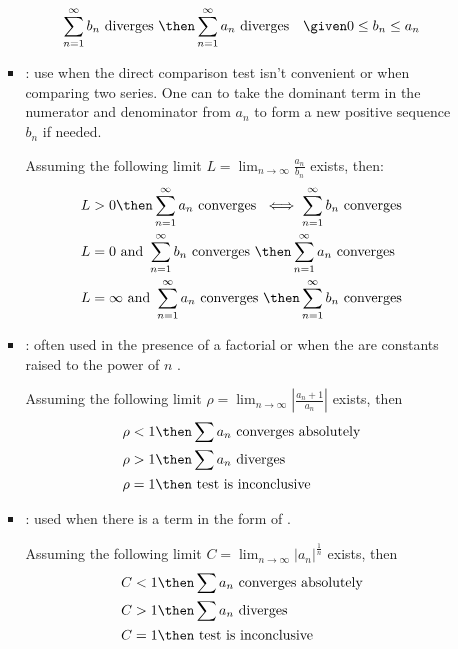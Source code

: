 \begin{itemize}
\begin{itemize}
\begin{itemize}
          \[%
          \sum_{n=1}^{\infty} b_n ~\text{diverges}~ \then
          \sum_{n=1}^{\infty} a_n ~\text{diverges} \quad \given 0 \leq
          b_n \leq a_n
          \]%

        \item {}: use when the direct comparison test
          isn't convenient or when comparing two series. One can to take the
          dominant term in the numerator and denominator from \(a_n\) to form
          a new positive sequence \(b_n\) if needed.

          Assuming the following limit \(L = \lim_{n \to \infty}
          \frac{a_n}{b_n}\) exists, then:
          \begin{align*}
            L &> 0 \then \sum_{n=1}^{\infty} a_n  ~\text{converges}~ \iff
            \sum_{n=1}^{\infty} b_n ~\text{converges}\\
            L &= 0 ~\text{and}~ \sum_{n=1}^{\infty} b_n ~\text{converges}~ \then
            \sum_{n=1}^{\infty} a_n ~\text{converges}\\
            L &= \infty ~\text{and}~ \sum_{n=1}^{\infty} a_n ~\text{converges}~
            \then \sum_{n=1}^{\infty} b_n ~\text{converges}
          \end{align*}

          \newpage %

        \item {}: often used in the presence of a factorial
           or when the are constants raised to the power of
          \(n\) .

          Assuming the following limit \(\rho = \lim_{n \to \infty} \left|
          \frac{a_n + 1}{a_n} \right| \) exists, then
          \begin{align*}
            \rho &< 1 \then \sum a_n ~\text{converges absolutely} \\
            \rho &> 1 \then \sum a_n ~\text{diverges} \\
            \rho &= 1 \then ~\text{test is inconclusive}~
          \end{align*}

        \item {}: used when there is a term in the form of
          .

          Assuming the following limit \(C = \lim_{n \to \infty}
          |a_n|^{\frac{1}{n}} \) exists, then
          \begin{align*}
            C &< 1 \then \sum a_n ~\text{converges absolutely} \\
            C &> 1 \then \sum a_n ~\text{diverges} \\
            C &= 1 \then ~\text{test is inconclusive}~
          \end{align*}


\end{itemize}
\end{itemize}
\end{itemize}
